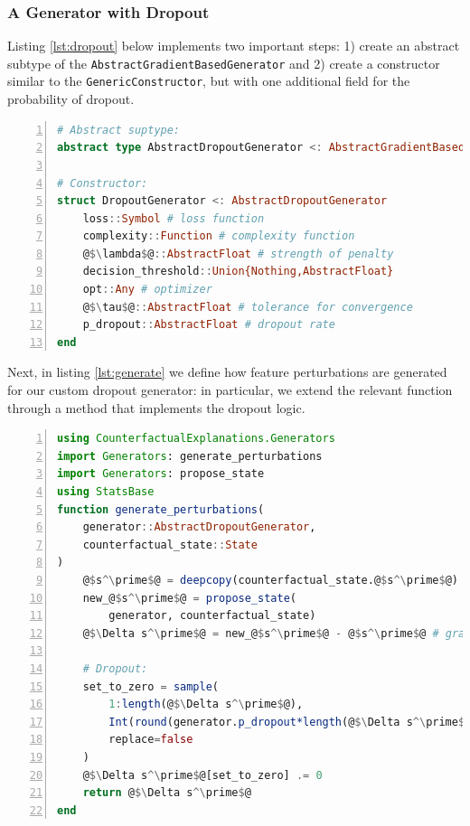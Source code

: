 \documentclass[
  letterpaper,
  DIV=11,
  numbers=noendperiod]{scrartcl}
\begin{document}
\hypertarget{a-generator-with-dropout}{%
\subsubsection{A Generator with
Dropout}\label{a-generator-with-dropout}}

Listing \ref{lst:dropout} below implements two important steps: 1)
create an abstract subtype of the
\texttt{AbstractGradientBasedGenerator} and 2) create a constructor
similar to the \texttt{GenericConstructor}, but with one additional
field for the probability of dropout.

\begin{lstlisting}[language=Julia, escapechar=@, numbers=left, label={lst:dropout}, caption={}]
# Abstract suptype:
abstract type AbstractDropoutGenerator <: AbstractGradientBasedGenerator end

# Constructor:
struct DropoutGenerator <: AbstractDropoutGenerator
    loss::Symbol # loss function
    complexity::Function # complexity function
    @$\lambda$@::AbstractFloat # strength of penalty
    decision_threshold::Union{Nothing,AbstractFloat} 
    opt::Any # optimizer
    @$\tau$@::AbstractFloat # tolerance for convergence
    p_dropout::AbstractFloat # dropout rate
end
\end{lstlisting}

Next, in listing \ref{lst:generate} we define how feature perturbations
are generated for our custom dropout generator: in particular, we extend
the relevant function through a method that implements the dropout
logic.

\begin{lstlisting}[language=Julia, escapechar=@, numbers=left, label={lst:generate}, caption={}]
using CounterfactualExplanations.Generators
import Generators: generate_perturbations
import Generators: propose_state
using StatsBase
function generate_perturbations(
    generator::AbstractDropoutGenerator, 
    counterfactual_state::State
)
    @$s^\prime$@ = deepcopy(counterfactual_state.@$s^\prime$@)
    new_@$s^\prime$@ = propose_state(
        generator, counterfactual_state)
    @$\Delta s^\prime$@ = new_@$s^\prime$@ - @$s^\prime$@ # gradient step

    # Dropout:
    set_to_zero = sample(
        1:length(@$\Delta s^\prime$@),
        Int(round(generator.p_dropout*length(@$\Delta s^\prime$@))),
        replace=false
    )
    @$\Delta s^\prime$@[set_to_zero] .= 0
    return @$\Delta s^\prime$@
end
\end{lstlisting}
\end{document}
